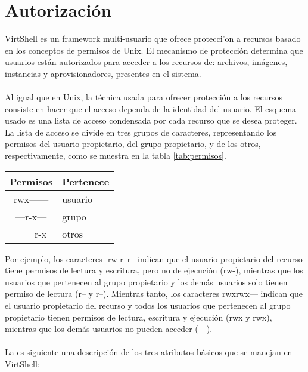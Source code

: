 \section{Autorización}
VirtShell es un framework multi-usuario que ofrece protecci'on a recursos basado en los conceptos de permisos de Unix. El mecanismo de protección determina que usuarios están autorizados para acceder a los recursos de: archivos, imágenes, instancias y aprovisionadores, presentes en el sistema. \\
\\
Al igual que en Unix, la técnica usada para ofrecer protección a los recursos consiste en hacer que el acceso dependa de la identidad del usuario. El esquema usado es una lista de acceso condensada por cada recurso que se desea proteger. La lista de acceso se divide en tres grupos de caracteres, representando los permisos del usuario propietario, del grupo propietario, y de los otros, respectivamente, como se muestra en la tabla \ref{tab:permisos}.

\begin{center}
 \label{tab:permisos}
 \begin{tabular}{| c | p{2.2cm} |}
 \hline
  \rowcolor{blueapi}
  \textbf{Permisos} & \textbf{Pertenece}  \\ [0.2ex] 
  \hline\hline
  rwx------ &  usuario \\
  \hline
  ---r-x--- & grupo \\  
  \hline
  ------r-x & otros \\
  \hline
\end{tabular}
\end{center}

Por ejemplo, los caracteres -rw-r--r-- indican que el usuario propietario del recurso tiene permisos de lectura y escritura, pero no de ejecución (rw-), mientras que los usuarios que pertenecen al grupo propietario y los demás usuarios solo tienen permiso de lectura (r-- y r--). Mientras tanto, los caracteres rwxrwx--- indican que el usuario propietario del recurso y todos los usuarios que pertenecen al grupo propietario tienen permisos de lectura, escritura y ejecución (rwx y rwx), mientras que los demás usuarios no pueden acceder (---). \\
\\
La es siguiente una descripción de los tres atributos básicos que se manejan en VirtShell:

